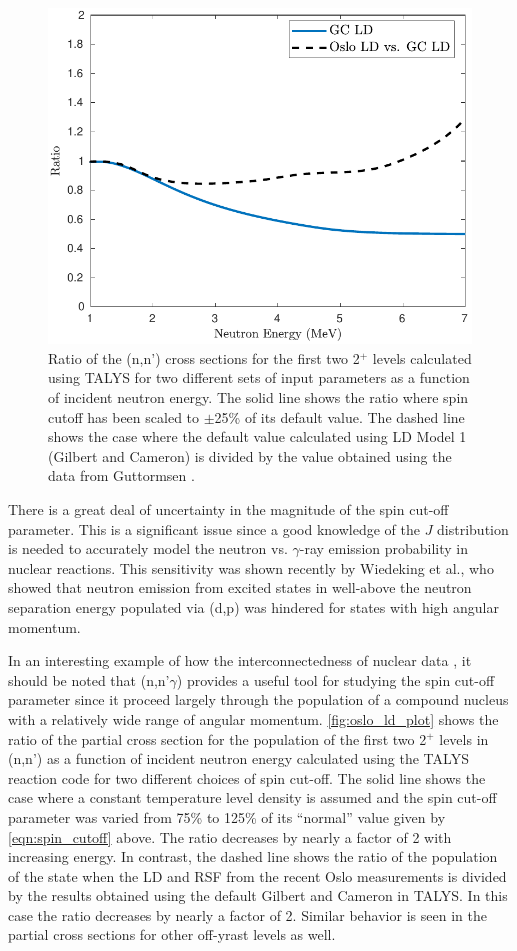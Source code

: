 \documentclass[letterpaper]{ar-1col}
\begin{document}
\begin{figure}
 \centering
 \includegraphics[width=0.55\linewidth]{fig3.pdf}

 \caption{Ratio of the (n,n') cross sections for the first two 2$^{+}$ levels calculated using TALYS for two different sets of input parameters as a function of incident neutron energy.
The solid line shows the ratio where spin cutoff has been scaled to $\pm$25\% of its default value.
The dashed line shows the case where the default value calculated using LD Model 1 (Gilbert and Cameron) is divided by the value obtained using the data from Guttormsen \cite{Gut13a}.}
 \label{fig:oslo_ld_plot}
\end{figure}

There is a great deal of uncertainty in the magnitude of the spin cut-off parameter.
 This is a significant issue since a good knowledge of the $J$ distribution is needed to accurately model the neutron vs. $\gamma$-ray emission probability in nuclear reactions.
 This sensitivity was shown recently by Wiedeking et al., \cite{Wie16} who showed that neutron emission from excited states in  well-above the neutron separation energy populated via (d,p) was hindered for states with high angular momentum.

In an interesting example of how the interconnectedness of nuclear data , it should be noted that (n,n'$\gamma$) provides a useful tool for studying the spin cut-off parameter since it proceed largely through the population of a compound nucleus with a relatively wide range of angular momentum.
\autoref{fig:oslo_ld_plot} shows the ratio of the partial cross section for the population of the first two 2$^{+}$ levels in (n,n') as a function of incident neutron energy calculated using the TALYS reaction code for two different choices of spin cut-off.
 The solid line shows the case where a constant temperature level density is assumed and the spin cut-off parameter was varied from 75\% to 125\% of its \enquote{normal} value given by \autoref{eqn:spin_cutoff} above.
 The ratio decreases by nearly a factor of 2 with increasing energy.
 In contrast, the dashed line shows the ratio of the  population of the  state when the LD and RSF from the recent Oslo measurements \cite{Gut13a} is divided by the results obtained using the default Gilbert and Cameron in TALYS.
 In this case the ratio decreases by nearly a factor of 2.
 Similar behavior is seen in the partial cross sections for other off-yrast levels as well.
\end{document}
